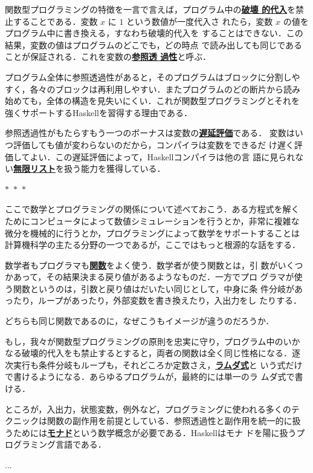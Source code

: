 \documentclass[a5paper,twoside,fleqn,draft]{jsbook}
\newcommand{\separator}{\begin{center}$*$~$*$~$*$\end{center}}
\newcommand{\programminglanguage}[1]{\textsf{#1}}
\newcommand{\haskell}{\programminglanguage{Haskell}}
\newcommand{\keyword}[1]{{\underline{\textbf{#1}}}}
\begin{document}
関数型プログラミングの特徴を一言で言えば，プログラム中の\keyword{破壊
  的代入}を禁止することである．変数 $x$ に $1$ という数値が一度代入さ
れたら，変数 $x$ の値をプログラム中に書き換える，すなわち破壊的代入を
することはできない．この結果，変数の値はプログラムのどこでも，どの時点
で読み出しても同じであることが保証される．これを変数の\keyword{参照透
  過性}と呼ぶ．

プログラム全体に参照透過性があると，そのプログラムはブロックに分割しや
すく，各々のブロックは再利用しやすい．またプログラムのどの断片から読み
始めても，全体の構造を見失いにくい．これが関数型プログラミングとそれを
強くサポートする\haskell を習得する理由である．

参照透過性がもたらすもう一つのボーナスは変数の\keyword{遅延評価}である．
変数はいつ評価しても値が変わらないのだから，コンパイラは変数をできるだ
け遅く評価してよい．この遅延評価によって，\haskell コンパイラは他の言
語に見られない\keyword{無限リスト}を扱う能力を獲得している．

\separator

ここで数学とプログラミングの関係について述べておこう．ある方程式を解く
ためにコンピュータによって数値シミュレーションを行うとか，非常に複雑な
微分を機械的に行うとか，プログラミングによって数学をサポートすることは
計算機科学の主たる分野の一つであるが，ここではもっと根源的な話をする．

数学者もプログラマも\keyword{関数}をよく使う．数学者が使う関数とは，引
数がいくつかあって，その結果決まる戻り値があるようなものだ．一方でプロ
グラマが使う関数というのは，引数と戻り値はだいたい同じとして，中身に条
件分岐があったり，ループがあったり，外部変数を書き換えたり，入出力をし
たりする．

どちらも同じ関数であるのに，なぜこうもイメージが違うのだろうか．

もし，我々が関数型プログラミングの原則を忠実に守り，プログラム中のいか
なる破壊的代入をも禁止するとすると，両者の関数は全く同じ性格になる．逐
次実行も条件分岐もループも，それどころか定数さえ，\keyword{ラムダ式}と
いう式だけで書けるようになる．あらゆるプログラムが，最終的には単一のラ
ムダ式で書ける．

ところが，入出力，状態変数，例外など，プログラミングに使われる多くのテ
クニックは関数の副作用を前提としている．参照透過性と副作用を統一的に扱
うためには\keyword{モナド}という数学概念が必要である．\haskell はモナ
ドを陽に扱うプログラミング言語である．

... %

\end{document}
